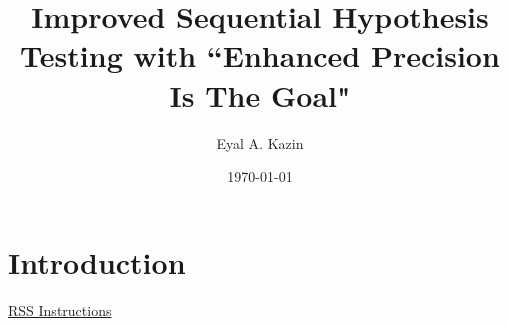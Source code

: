 \documentclass{article}
\title{Improved Sequential Hypothesis Testing with
``Enhanced Precision Is The Goal"}
\date{\today}
\author{Eyal A. Kazin}
\begin{document}
\maketitle



\section{Introduction}


\href{https://academic.oup.com/rssdat/pages/general-instructions}{RSS Instructions} 

\printbibliography
\end{document}
